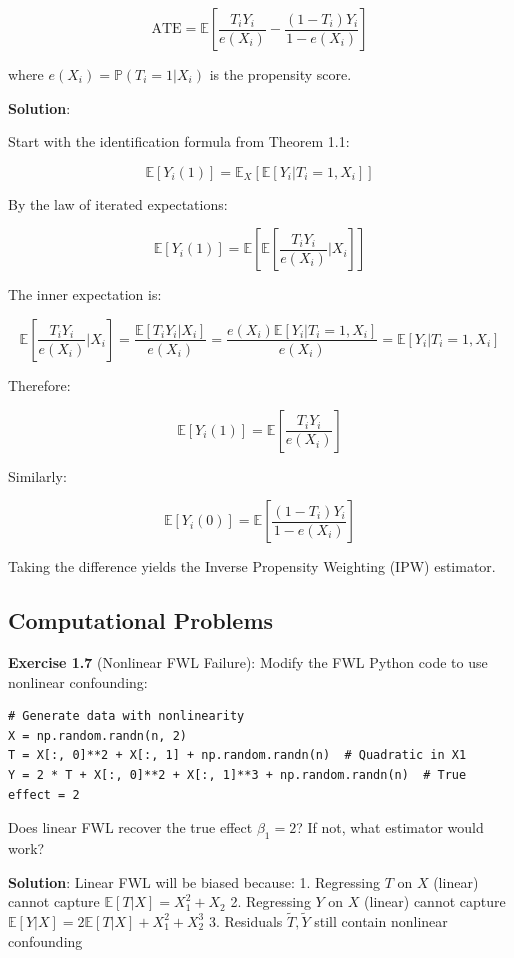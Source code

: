 \[\text{ATE} = \mathbb{E}\left[\frac{T_i Y_i}{e(X_i)} - \frac{(1 - T_i) Y_i}{1 - e(X_i)}\right]\]

where \(e(X_i) = \mathbb{P}(T_i = 1 | X_i)\) is the propensity score.

\textbf{Solution}:

Start with the identification formula from Theorem 1.1:

\[\mathbb{E}[Y_i(1)] = \mathbb{E}_X[\mathbb{E}[Y_i | T_i = 1, X_i]]\]

By the law of iterated expectations:

\[\mathbb{E}[Y_i(1)] = \mathbb{E}\left[\mathbb{E}\left[\frac{T_i Y_i}{e(X_i)} \bigg| X_i\right]\right]\]

The inner expectation is:

\[\mathbb{E}\left[\frac{T_i Y_i}{e(X_i)} \bigg| X_i\right] = \frac{\mathbb{E}[T_i Y_i | X_i]}{e(X_i)} = \frac{e(X_i) \mathbb{E}[Y_i | T_i = 1, X_i]}{e(X_i)} = \mathbb{E}[Y_i | T_i = 1, X_i]\]

Therefore:

\[\mathbb{E}[Y_i(1)] = \mathbb{E}\left[\frac{T_i Y_i}{e(X_i)}\right]\]

Similarly:

\[\mathbb{E}[Y_i(0)] = \mathbb{E}\left[\frac{(1 - T_i) Y_i}{1 - e(X_i)}\right]\]

Taking the difference yields the Inverse Propensity Weighting (IPW)
estimator.

\subsection{Computational Problems}\label{_computational_problems}

\textbf{Exercise 1.7} (Nonlinear FWL Failure): Modify the FWL Python code to use nonlinear confounding:

\begin{verbatim}
# Generate data with nonlinearity
X = np.random.randn(n, 2)
T = X[:, 0]**2 + X[:, 1] + np.random.randn(n)  # Quadratic in X1
Y = 2 * T + X[:, 0]**2 + X[:, 1]**3 + np.random.randn(n)  # True effect = 2
\end{verbatim}

Does linear FWL recover the true effect \(\beta_1 = 2\)? If not, what
estimator would work?

\textbf{Solution}: Linear FWL will be biased because: 1. Regressing
\(T\) on \(X\) (linear) cannot capture \(\mathbb{E}[T|X] = X_1^2 + X_2\)
2. Regressing \(Y\) on \(X\) (linear) cannot capture
\(\mathbb{E}[Y|X] = 2\mathbb{E}[T|X] + X_1^2 + X_2^3\)
3. Residuals \(\tilde{T}, \tilde{Y}\) still
contain nonlinear confounding

